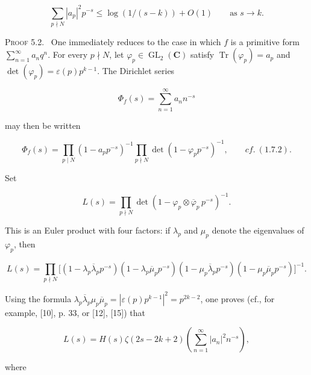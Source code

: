 \documentclass[10pt,oneside]{article}
\begin{document}
\begin{equation*}
\tag{5.1.1}
\sum_{p\nmid N}|a_p|^2p^{-s}\leq\log(1/(s-k))+O(1)
\qquad\text{as }s\longrightarrow k.
\end{equation*}

\noindent\textsc{Proof 5.2.} \textemdash\ One immediately reduces to the case in which \(f\) is a primitive form \(\sum_{n=1}^{\infty}a_nq^n\). For every \(p\nmid N\), let \(\varphi_p\in\operatorname{GL}_2(\mathbf{C})\) satisfy \(\operatorname{Tr}(\varphi_p)=a_p\) and \(\det(\varphi_p)=\varepsilon(p)p^{k-1}\). The Dirichlet series\par

\begin{equation*}
\Phi_f(s)=\sum_{n=1}^{\infty}a_nn^{-s}
\end{equation*}

may then be written\par

\begin{equation*}
\Phi_f(s)=\prod_{p\mid N}(1-a_pp^{-s})^{-1}
\prod_{p\nmid N}\det(1-\varphi_pp^{-s})^{-1},
\qquad cf.\ (1.7.2).
\end{equation*}

Set\par

\begin{equation*}
L(s)=\prod_{p\nmid N}\det(1-\varphi_p\otimes\overline{\varphi}_p\,p^{-s})^{-1}.
\end{equation*}

This is an Euler product with four factors: if \(\lambda_p\) and \(\mu_p\) denote the eigenvalues of \(\varphi_p\), then\par

\begin{equation*}
L(s)=\prod_{p\nmid N}
\bigl[(1-\lambda_p\overline{\lambda}_pp^{-s})
(1-\lambda_p\overline{\mu}_pp^{-s})
(1-\mu_p\overline{\lambda}_pp^{-s})
(1-\mu_p\overline{\mu}_pp^{-s})\bigr]^{-1}.
\end{equation*}

Using the formula \(\lambda_p\overline{\lambda}_p\mu_p\overline{\mu}_p=|\varepsilon(p)p^{k-1}|^2=p^{2k-2}\), one proves (cf., for example, [10], p. 33, or [12], [15]) that\par

\begin{equation*}
L(s)=H(s)\zeta(2s-2k+2)\left(\sum_{n=1}^{\infty}|a_n|^2n^{-s}\right),
\end{equation*}

where\par
\end{document}
